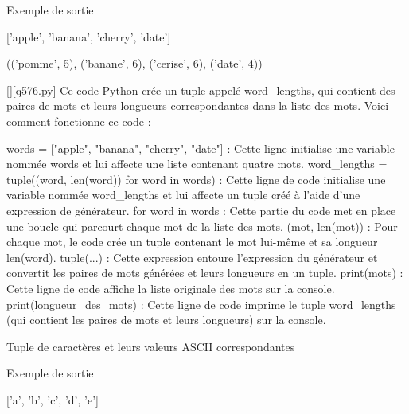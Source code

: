 Exemple de sortie

['apple', 'banana', 'cherry', 'date']

(('pomme', 5), ('banane', 6), ('cerise', 6), ('date', 4))
        \par
        \begin{solution}
            \renewcommand{\nomfichier}{q576.py}
            \pythonfile{\chemincode \nomfichier}[][\nomfichier]
            Ce code Python crée un tuple appelé word_lengths, qui contient des paires de mots et leurs longueurs correspondantes dans la liste des mots. Voici comment fonctionne ce code :

    words = ["apple", "banana", "cherry", "date"] : Cette ligne initialise une variable nommée words et lui affecte une liste contenant quatre mots.
    word_lengths = tuple((word, len(word)) for word in words) : Cette ligne de code initialise une variable nommée word_lengths et lui affecte un tuple créé à l'aide d'une expression de générateur.
        for word in words : Cette partie du code met en place une boucle qui parcourt chaque mot de la liste des mots.
        (mot, len(mot)) : Pour chaque mot, le code crée un tuple contenant le mot lui-même et sa longueur len(word).
        tuple(...) : Cette expression entoure l'expression du générateur et convertit les paires de mots générées et leurs longueurs en un tuple.
    print(mots) : Cette ligne de code affiche la liste originale des mots sur la console.
    print(longueur_des_mots) : Cette ligne de code imprime le tuple word_lengths (qui contient les paires de mots et leurs longueurs) sur la console.
        \end{solution}
        

        \question
        Tuple de caractères et leurs valeurs ASCII correspondantes

Exemple de sortie

['a', 'b', 'c', 'd', 'e']

